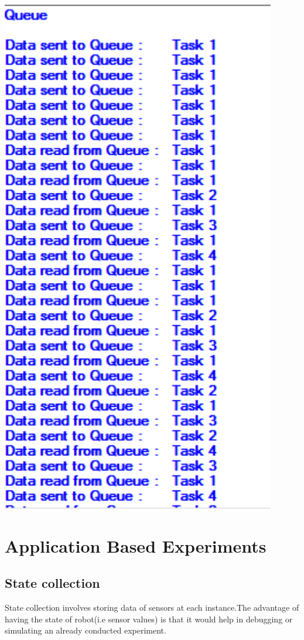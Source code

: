 \documentclass[11pt,a4paper]{article}
\begin{document}
	\includegraphics[width=12cm]{q}
	\section{Application Based Experiments}
	\subsection{State collection}
	State collection involves storing data of sensors at each instance.The advantage of having the state of robot(i.e sensor values) is that it would help in debugging or simulating an already conducted experiment.
	
\end{document}
